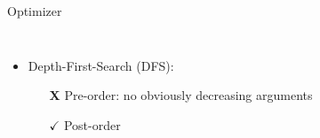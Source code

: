\documentclass[aspectratio=169,xcolor=dvipsnames]{beamer}
\begin{document}
    \begin{frame}{Optimizer}
        \begin{columns}
             \begin{itemize}
                \item Depth-First-Search (DFS):
                \begin{itemize}
                    \item[\textbf{X}] Pre-order: no obviously decreasing arguments
                    \item[$\checkmark$] \alert{Post-order}
                \end{itemize}
            \end{itemize}
            \begin{minipage}[t][\textheight][t]{\textwidth}

\end{minipage}
\end{columns}
\end{frame}
\end{document}
